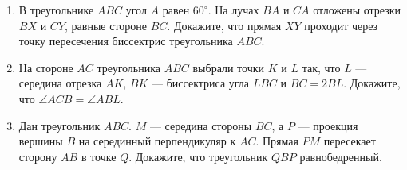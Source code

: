 \documentclass{article}
\begin{document}
\begin{enumerate}[label*=\protect\fbox{\arabic{enumi}}]
\item В треугольнике $ABC$ угол $A$ равен $60^\circ$. На лучах $BA$ и $CA$ отложены отрезки $BX$ и $CY$, равные стороне $BC$. Докажите, что прямая $XY$ проходит через точку пересечения биссектрис треугольника $ABC$.

\item На стороне $AC$ треугольника $ABC$ выбрали точки $K$ и $L$ так, что $L$ — середина отрезка $AK$, $BK$ — биссектриса угла $LBC$ и $BC=2BL$. Докажите, что $\angle ACB= \angle ABL$.

\item Дан треугольник $ABC$. $M$ — середина стороны $BC$, а $P$ — проекция вершины $B$ на серединный перпендикуляр к $AC$. Прямая $PM$ пересекает сторону $AB$ в точке $Q$. Докажите, что треугольник $QBP$ равнобедренный.





\end{enumerate}
\end{document}
